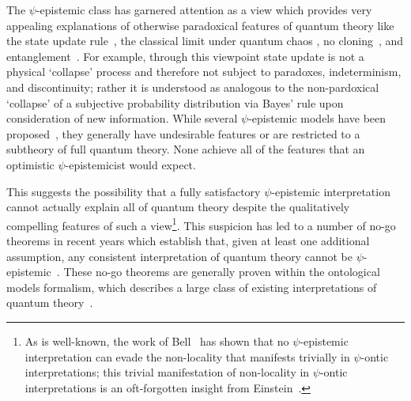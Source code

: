 \documentclass[%
 reprint, onecolumn, 12pt,
superscriptaddress,
nofootinbib,
 prx, 
]{quantumarticle}
\begin{document}
The $\psi$-epistemic class has garnered attention as a view which
provides very appealing explanations of otherwise paradoxical features
of quantum theory like the state update
rule~\cite{BallentineStatisticalInterpretationQuantum1970}, the
classical limit under quantum chaos
\cite{EmersonQuantumChaosQuantumClassical2002}, no
cloning~\cite{FuchsQuantumMechanicsQuantum2002}, and
entanglement~\cite{GrossHudsonTheoremfinitedimensional2006}. For
example, through this viewpoint state update is not a physical
`collapse' process and therefore not subject to paradoxes,
indeterminism, and discontinuity; rather it is understood as analogous
to the non-pardoxical `collapse' of a subjective probability
distribution via Bayes' rule upon consideration of new information.
While several $\psi$-epistemic models have been
proposed~\cite{KochenProblemHiddenVariables1967,MontinaDynamicsqubitclassical2012,LewisDistinctQuantumStates2012,Aaronsonpsepistemictheoriesrole2013,HarriganRepresentingprobabilisticdata2007,Spekkensdefenseepistemicview2007,WallmanNonnegativesubtheoriesquasiprobability2012},
they generally have undesirable features or are restricted to a
subtheory of full quantum theory.  None achieve all of the features
that an optimistic $\psi$-epistemicist would expect.

This suggests the possibility that a fully satisfactory
$\psi$-epistemic interpretation cannot actually explain all of quantum
theory despite the qualitatively compelling features of such a
view\footnote{As is well-known, the work of
  Bell~\cite{BellProblemHiddenVariables1966} has shown that no
  $\psi$-epistemic interpretation can evade the non-locality that
  manifests trivially in $\psi$-ontic interpretations; this trivial
  manifestation of non-locality in $\psi$-ontic interpretations is an
  oft-forgotten insight from
  Einstein~\cite{HarriganEinsteinincompletenessepistemic2010,HowardEinsteinlocalityseparability1985,EinsteinCanQuantumMechanicalDescription1935}.}. This
suspicion has led to a number of no-go theorems in recent years which
establish that, given at least one additional assumption, any
consistent interpretation of quantum theory cannot be
$\psi$-epistemic~\cite{Puseyrealityquantumstate2012,Aaronsonpsepistemictheoriesrole2013,Colbecksystemwavefunction2017,HardyAREQUANTUMSTATES2013,MansfieldRealityquantumstate2016}.
These no-go theorems are generally proven within the ontological
models formalism, which describes a large class of existing
interpretations of quantum
theory~\cite{SpekkensContextualitypreparationstransformations2005,HarriganOntologicalmodelsinterpretation2007,RudolphOntologicalModelsQuantum2006}.
   
\end{document}
